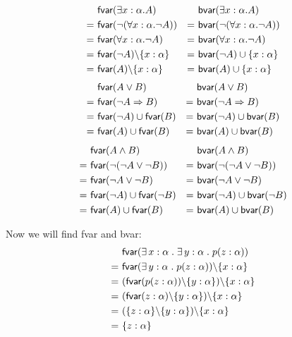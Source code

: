 \documentclass[11pt,fleqn]{article}
\newcommand{\mname}[1]{\mbox{\sf #1}}
\newcommand{\ForsomeApp}{\exists\,}
\newcommand{\mdot}{\mathrel.}
\begin{document}
      \begin{align*}
	  	& \mname{fvar}(\exists x:\alpha . A) 					& &\mname{bvar}(\exists x:\alpha . A)\\
	  	=~ & \mname{fvar}(\neg{(\forall x:\alpha . \neg{A})}) 	& =~ & \mname{bvar}(\neg{(\forall x:\alpha . \neg{A})})\\
	  	=~ & \mname{fvar}(\forall x:\alpha . \neg{A}) 			& =~ & \mname{bvar}(\forall x:\alpha . \neg{A})\\
	  	=~ & \mname{fvar}(\neg{A})\backslash \{x:\alpha\} 		& =~ & \mname{bvar}(\neg{A}) \cup \{x:\alpha\}\\
	  	=~ & \mname{fvar}(A)\backslash \{x:\alpha\} 			& =~ & \mname{bvar}(A) \cup \{x:\alpha\}
      \end{align*}
      \begin{align*}
      	& \mname{fvar}(A \vee B) 								& & \mname{bvar}(A \vee B)\\
      	=~ & \mname{fvar}(\neg{A} \Rightarrow B) 				& =~ & \mname{bvar}(\neg{A} \Rightarrow B)\\
      	=~ & \mname{fvar}(\neg{A}) \cup \mname{fvar}(B) 		& =~ & \mname{bvar}(\neg{A}) \cup \mname{bvar}(B)\\
      	=~ & \mname{fvar}(A) \cup \mname{fvar}(B) 				& =~ & \mname{bvar}(A) \cup \mname{bvar}(B)
      \end{align*}
      \begin{align*}
		& \mname{fvar}(A \wedge B) 								& & \mname{bvar}(A \wedge B)\\
		=~ & \mname{fvar}(\neg{(\neg{A} \vee \neg{B})}) 		& =~ & \mname{bvar}(\neg{(\neg{A} \vee \neg{B})})\\
		=~ & \mname{fvar}(\neg{A} \vee \neg{B}) 				& =~ & \mname{bvar}(\neg{A} \vee \neg{B})\\
		=~ & \mname{fvar}(\neg{A}) \cup \mname{fvar}(\neg{B}) 	& =~ & \mname{bvar}(\neg{A}) \cup \mname{bvar}(\neg{B})\\
		=~ & \mname{fvar}(A) \cup \mname{fvar}(B) 				& =~ & \mname{bvar}(A) \cup \mname{bvar}(B)
	  \end{align*}

	Now we will find \mname{fvar} and \mname{bvar}:
	\begin{align*}
		& \mname{fvar}(\ForsomeApp x : \alpha \mdot \ForsomeApp y : \alpha \mdot p(z:\alpha)) \\
		=~ & \mname{fvar}(\ForsomeApp y : \alpha \mdot p(z:\alpha)) \backslash\{x : \alpha\} \\
		=~ & (\mname{fvar}(p(z:\alpha)) \backslash\{y : \alpha\}) \backslash\{x : \alpha\} \\
		=~ & (\mname{fvar}(z:\alpha) \backslash\{y : \alpha\}) \backslash\{x : \alpha\} \\
		=~ & (\{z:\alpha\} \backslash\{y : \alpha\}) \backslash\{x : \alpha\} \\
		=~ & \{z:\alpha\}
	\end{align*}
	
\end{document}

